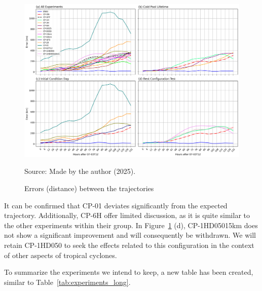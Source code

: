 \begin{figure}[!htb]
    \centering
    \caption{Errors (distance) between the trajectories} %
    \includegraphics[width=\textwidth]{docs/figuras/findings/panel_2x2_error_comparison.png} %
    \vspace{0.5em}
    
    Source: Made by the author (2025). %
    \label{fig:panel_errors_before} %
\end{figure}

\pagebreak

It can be confirmed that CP-01 deviates significantly from the expected trajectory. Additionally, CP-6H offer limited discussion, as it is quite similar to the other experiments within their group. In Figure~\ref{fig:panel_errors_before} (d), CP-1HD05015km does not show a significant improvement and will consequently be withdrawn. We will retain CP-1HD050 to seek the effects related to this configuration in the context of other aspects of tropical cyclones.

To summarize the experiments we intend to keep, a new table has been created, similar to Table~\ref{tab:experiments_long}.

\pagebreak

\begin{center}
 \label{tab:selected_experiments}
\end{center}

